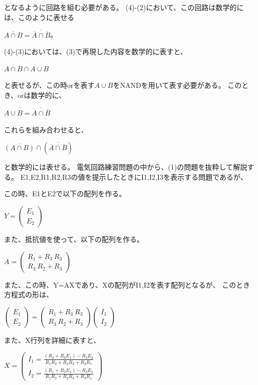 \documentclass[a4paper,titlepage,11pt]{ltjsarticle}
\begin{document}
となるように回路を組む必要がある。
(4)-(2)において、この回路は数学的には、このように表せる

$\overline{A\cap B}= \overline{\overline{A}\cap\overline{B}}$。

(4)-(3)においては、(3)で再現した内容を数学的に表すと、

$\overline{A\cap B} \cap A\cup B$

と表せるが、この時orを表す$A\cup B$をNANDを用いて表す必要がある。
このとき、orは数学的に、

$A\cup B = \overline{\overline{A}\cap \overline{B}}$

これらを組み合わせると、

$\overline{(A\cap B)} \cap (\overline{\overline{A}\cap \overline{B}})$

と数学的には表せる。
電気回路練習問題の中から、(1)の問題を抜粋して解説する。
E1,E2,R1,R2,R3の値を提示したときにI1,I2,I3を表示する問題であるが、

この時、E1とE2で以下の配列を作る。

$Y=\left(
  \begin{array}{r}
  E_{1} \\
  E_{2}
  \end{array}
\right)$

また、抵抗値を使って、以下の配列を作る。

$A=\left(
  \begin{array}{rr}
  R_{1}+R_{3} \ R_{3} \\
  R_{3} \ R_{2}+R_{3}
  \end{array}
\right)$

また、この時、Y=AXであり、Xの配列がI1,I2を表す配列となるが、
このとき方程式の形は、

$\left(
  \begin{array}{r}
  E_{1} \\
  E_{2}
  \end{array}
\right)
=
\left(
  \begin{array}{rr}
  R_{1}+R_{3} \ R_{3} \\
  R_{3} \ R_{2}+R_{3}
  \end{array}
\right)
\left(
  \begin{array}{r}
  I_{1} \\
  I_{2}
  \end{array}
\right)
$

また、X行列を詳細に表すと、

$X=\left(
  \begin{array}{r}
I_{1}=\frac{(R_{2}+R_{3}E_{1})-R_{3}E_{2}}
{R_{1}R_{2}+R_{2}R_{3}+R_{3}R_{1}} \\
I_{2}=\frac{(R_{1}+R_{3}E_{2})-R_{3}E_{1}}
{R_{1}R_{2}+R_{2}R_{3}+R_{3}R_{1}}
  \end{array}
\right)$
\end{document}
